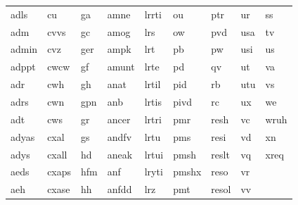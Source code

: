 \begin{table}[]
\begin{tabular}{@{}lllllllll@{}}
adls  & cu    & ga    & amne  & lrrti & ou    & ptr   & ur    & ss    \\
adm   & cvvs  & gc    & amog  & lrs   & ow    & pvd   & usa   & tv    \\
admin & cvz   & ger   & ampk  & lrt   & pb    & pw    & usi   & us    \\
adppt & cwcw  & gf    & amunt & lrte  & pd    & qv    & ut    & va    \\
adr   & cwh   & gh    & anat  & lrtil & pid   & rb    & utu   & vs    \\
adrs  & cwn   & gpn   & anb   & lrtis & pivd  & rc    & ux    & we    \\
adt   & cws   & gr    & ancer & lrtri & pmr   & resh  & vc    & wruh  \\
adyas & cxal  & gs    & andfv & lrtu  & pms   & resi  & vd    & xn    \\
adys  & cxall & hd    & aneak & lrtui & pmsh  & reslt & vq    & xreq  \\
aeds  & cxaps & hfm   & anf   & lryti & pmshx & reso  & vr    &       \\
aeh   & cxase & hh    & anfdd & lrz   & pmt   & resol & vv    &      
\end{tabular}
\end{table}